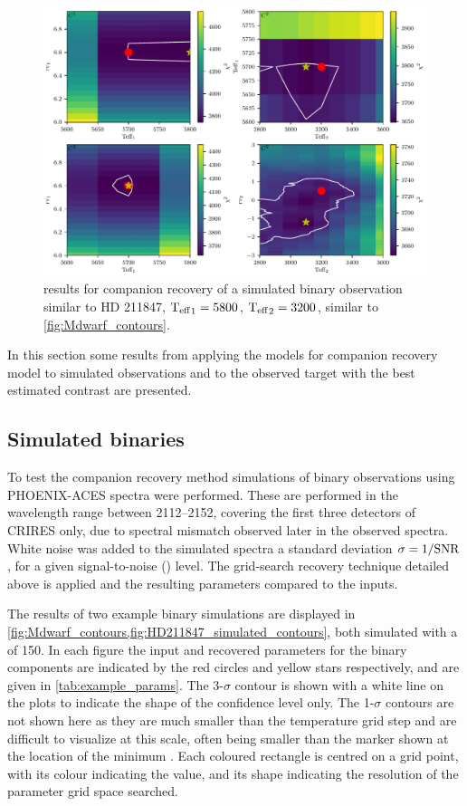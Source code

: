 \begin{figure}
    \centering
    \includegraphics[width=0.7\linewidth]{figures/companion_recovery/HD211847_example_pcolors}
    \caption[\textchisquared{} contour for companion recovery of a simulated observation of {HD 211847}.]{ \textchisquared{} results for companion recovery of a simulated binary observation similar to {HD 211847}, \({\textrm{T}_{\mathrm{eff}}}_{1} = 5800\)\K{}, \({\textrm{T}_{\mathrm{eff}}}_{2} = 3200\)\K{}, similar to \cref{fig:Mdwarf_contours}.}
    \label{fig:HD211847_simulated_contours}
\end{figure}

In this section some results from applying the models for companion recovery model to simulated observations and to the observed target with the best estimated contrast are presented.

\subsection{Simulated binaries}
\label{subsec:simulated_binaries}
To test the companion recovery method simulations of binary observations using {PHOENIX-ACES} spectra were performed.
These are performed in the wavelength range between 2112--2152\nm{}, covering the first three detectors of CRIRES only, due to spectral mismatch observed later in the observed spectra.
White noise was added to the simulated spectra a standard deviation \(\sigma = 1/{\textrm{SNR}{}}\), for a given signal-to-noise (\snr{}) level.
The \textchisquared{} grid-search recovery technique detailed above is applied and the resulting parameters compared to the inputs.

The results of two example binary simulations are displayed in \cref{fig:Mdwarf_contours,fig:HD211847_simulated_contours}, both simulated with a \snr{} of 150.
In each figure the input and recovered parameters for the binary components are indicated by the red circles and yellow stars respectively, and are given in \cref{tab:example_params}.
The 3-\(\sigma\) contour is shown with a white line on the plots to indicate the shape of the confidence level only.
The 1-\(\sigma\) contours are not shown here as they are much smaller than the temperature grid step and are difficult to visualize at this scale, often being smaller than the marker shown at the location of the minimum \textchisquared{}.
Each coloured rectangle is centred on a grid point, with its colour indicating the \textchisquared{} value, and its shape indicating the resolution of the parameter grid space searched.

